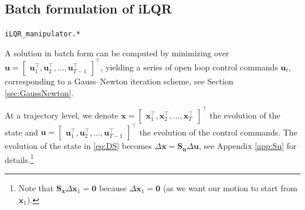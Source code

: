 \documentclass[10pt,a4paper]{article} %
\newcommand{\trsp}{{\scriptscriptstyle\top}}
\newcommand{\filename}[1]{\colorbox{rr2}{\color{white}\texttt{#1}}}
\begin{document}


\subsection{Batch formulation of iLQR}\label{sec:iLQRbatch}
\begin{flushright}
\filename{iLQR\_manipulator.*}
\end{flushright}

A solution in batch form can be computed by minimizing over $\bm{u}\!=\!{\begin{bmatrix}\bm{u}_1^\trsp, \bm{u}_2^\trsp, \ldots, \bm{u}_{T-1}^\trsp \end{bmatrix}}^\trsp$, yielding a series of open loop control commands $\bm{u}_t$, corresponding to a Gauss--Newton iteration scheme, see Section \ref{sec:GaussNewton}. 

At a trajectory level, we denote $\bm{x}\!=\!{\begin{bmatrix}\bm{x}_1^\trsp, \bm{x}_2^\trsp, \ldots, \bm{x}_T^\trsp \end{bmatrix}}^\trsp$ %
the evolution of the state and $\bm{u}\!=\!{\begin{bmatrix}\bm{u}_1^\trsp, \bm{u}_2^\trsp, \ldots, \bm{u}_{T-1}^\trsp \end{bmatrix}}^\trsp$ %
the evolution of the control commands. 
The evolution of the state in \eqref{eq:DS} becomes $\Delta\bm{x} = \bm{S}_{\bm{u}} \Delta\bm{u}$, see Appendix \ref{app:Su} for details.\footnote{Note that $\bm{S}_{\bm{x}} \Delta\bm{x}_1\!=\!\bm{0}$ because $\Delta\bm{x}_1\!=\!\bm{0}$ (as we want our motion to start from $\bm{x}_1$).}
\end{document}
